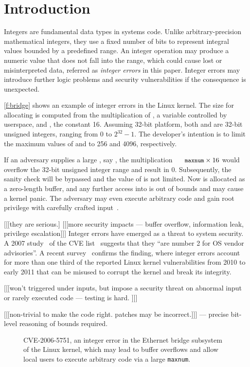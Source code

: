\section{Introduction}
\label{s:intro}

Integers are fundamental data types in systems code.  Unlike
arbitrary-precision mathematical integers, they use a fixed number
of bits to represent integral values bounded by a predefined range.
An integer operation may produce a numeric value that does not fall
into the range, which could cause lost or misinterpreted data, referred
as \emph{integer errors} in this paper.  Integer errors may introduce
further logic problems and security vulnerabilities if the consequence
is unexpected.

\autoref{f:bridge} shows an example of integer errors in the Linux
kernel.  The size for allocating  is computed from the
multiplication of , a variable controlled by userspace,
and , the constant 16.  Assuming
32-bit platform, both  and  are 32-bit unsigned
integers, ranging from 0 to $2^{32} - 1$.
The developer's intention is to limit the maximum values of 
 and  to 256 and 4096, respectively.

If an adversary supplies a large , say ,
the multiplication $\cc{maxnum} \times 16$ would overflow the 32-bit
unsigned integer range and result in 0.  Subsequently, the sanity
check will be bypassed and the value of  is not limited.
Now  is allocated as a zero-length buffer, and any further
access into  is out of bounds and may cause a kernel panic.
The adversary may even execute arbitrary code and gain root privilege
with carefully crafted input~\cite[CVE-2006-5751]{cve}.

[[[they are serious.]
[[[more security impacts --- buffer overflow, information leak,
privilege escalation]]]
Integer errors have emerged as a threat to system security.  A 2007
study~\cite{christey:vuln} of the CVE list~\cite{cve} suggests that they ``are
number 2 for OS vendor advisories''.  A recent survey~\cite{chen:kbugs}
confirms the finding, where integer errors account for more than
one third of the reported Linux kernel vulnerabilities from 2010
to early 2011 that can be misused to corrupt the kernel and break
its integrity.

[[[won't triggered under inputs, but impose a security threat
on abnormal input or rarely executed code --- testing is hard.
]]]

[[[non-trivial to make the code right. patches may be incorrect.]]]
--- precise bit-level reasoning of bounds required.

\begin{figure}

\caption{CVE-2006-5751, an integer error in the Ethernet bridge subsystem
of the Linux kernel, which may lead to buffer overflows and allow local users
to execute arbitrary code via a large \texttt{maxnum}.}
\label{f:bridge}
\end{figure}
